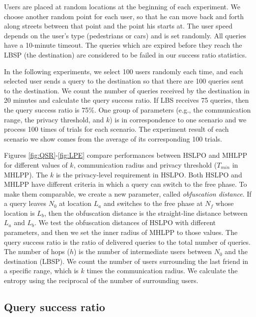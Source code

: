 Users are placed at random locations at the beginning of each experiment. We choose another random point for each user, so that he can move back and forth along streets between that point and the point his starts at. The user speed depends on the user's type (pedestrians or cars) and is set randomly. All queries have a 10-minute timeout. The queries which are expired before they reach the LBSP (the destination) are considered to be failed in our success ratio statistics.

In the following experiments, we select 100 users randomly each time, and each selected user sends a query to the destination so that there are 100 queries sent to the destination. We count the number of queries received by the destination in 20 minutes and calculate the query success ratio. If LBS receives 75 queries, then the query success ratio is 75\%. One group of parameters (e.g., the communication range, the privacy threshold, and $k$) is in correspondence to one scenario and we process 100 times of trials for each scenario. The experiment result of each scenario we show comes from the average of its corresponding 100 trials.

Figures \ref{fig:QSR}-\ref{fig:LPE} compare performances between HSLPO and MHLPP for different values of $k$, communication radius and privacy threshold (${T}_{min}$ in MHLPP). The $k$ is the privacy-level requirement in HSLPO. Both HSLPO and MHLPP have different criteria in which a query can switch to the free phase. To make them comparable, we create a new parameter, called \textit{obfuscation distance}. If a query leaves ${N}_{0}$ at location ${L}_{a}$ and switches to the free phase at ${N}_{f}$ whose location is ${L}_{b}$, then the obfuscation distance is the straight-line distance between ${L}_{a}$ and ${L}_{b}$. We test the obfuscation distances of HSLPO with different parameters, and then we set the inner radius of MHLPP to those values. The query success ratio is the ratio of delivered queries to the total number of queries. The number of hops ($h$) is the number of intermediate users between ${N}_{0}$ and the destination (LBSP). We count the number of users surrounding the last friend in a specific range, which is $k$ times the communication radius. We calculate the entropy using the reciprocal of the number of surrounding users.

\subsection{ Query success ratio}

